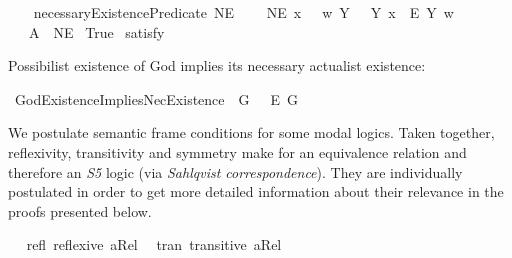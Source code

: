 \begin{isabellebody}
\ \ %
%
\isanewline
%
\isamarkupfalse%
\ necessaryExistencePredicate{\isacharcolon}{\isacharcolon}{\isachardoublequoteopen}{\isasymup}{\isasymlangle}{\isasymzero}{\isasymrangle}{\isachardoublequoteclose}\ {\isacharparenleft}{\isachardoublequoteopen}NE{\isachardoublequoteclose}{\isacharparenright}\ \isanewline
\ \ \ {\isachardoublequoteopen}NE\ x\ \ {\isasymequiv}\ {\isacharparenleft}{\isasymlambda}w{\isachardot}\ {\isacharparenleft}\isactrlbold {\isasymforall}Y{\isachardot}\ \ {\isasymE}\ Y\ x\ \isactrlbold {\isasymrightarrow}\ \isactrlbold {\isasymbox}\isactrlbold {\isasymexists}\isactrlsup E\ Y{\isacharparenright}\ w{\isacharparenright}{\isachardoublequoteclose}\isanewline
\isanewline
{}\isamarkupfalse%
\ \ \ A{}{\isacharcolon}\ {\isachardoublequoteopen}{\isasymlfloor}{\isasymP}\ NE{\isasymrfloor}{\isachardoublequoteclose}\isanewline
{}\isamarkupfalse%
\ True\ \isamarkupfalse%
{\isacharbrackleft}satisfy{\isacharbrackright}%
\ %
%
\isamarkupfalse%
\ %
%
%
%
%
\begin{isamarkuptext}%
Possibilist existence of God implies its necessary actualist existence:%
\end{isamarkuptext}\isamarkuptrue%
\isamarkupfalse%
\ GodExistenceImpliesNecExistence{\isacharcolon}\ {\isachardoublequoteopen}{\isasymlfloor}\isactrlbold {\isasymexists}\ G\ \isactrlbold {\isasymrightarrow}\ \ \isactrlbold {\isasymbox}\isactrlbold {\isasymexists}\isactrlsup E\ G{\isasymrfloor}{\isachardoublequoteclose}\isanewline
%
%
%
\isamarkupfalse%
\ {\isacharminus}\ %
\isanewline
\ \ %
%
%
%
\begin{isamarkuptext}%
We postulate semantic frame conditions for some modal logics. Taken together, reflexivity, transitivity and symmetry
 make for an equivalence relation and therefore an \emph{S5} logic (via \emph{Sahlqvist correspondence}).
 They are individually postulated in order to get more detailed information about their relevance in the proofs presented below.%
\end{isamarkuptext}\isamarkuptrue%
\isamarkupfalse%
\ \isanewline
\ refl{\isacharcolon}\ {\isachardoublequoteopen}reflexive\ aRel{\isachardoublequoteclose}\ \isanewline
\ tran{\isacharcolon}\ {\isachardoublequoteopen}transitive\ aRel{\isachardoublequoteclose}\ \isanewline

\end{isabellebody}
